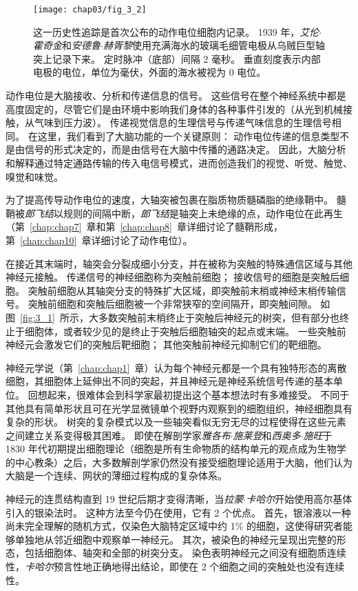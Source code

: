 \begin{figure}[htbp]
	\centering
	\texttt{[image: chap03/fig\_3\_2]}
	\caption{这一历史性追踪是首次公布的动作电位细胞内记录。 
		1939 年，\textit{艾伦$\cdot$霍奇金}和\textit{安德鲁$\cdot$赫胥黎}使用充满海水的玻璃毛细管电极从乌贼巨型轴突上记录下来。
		定时脉冲（底部）间隔 2 毫秒。 
		垂直刻度表示内部电极的电位，单位为毫伏，外面的海水被视为 0 电位\cite{hodgkin1939action}。}
	\label{fig:3_2}
\end{figure}


动作电位是大脑接收、分析和传递信息的信号。 
这些信号在整个神经系统中都是高度固定的，尽管它们是由环境中影响我们身体的各种事件引发的（从光到机械接触，从气味到压力波）。
传递视觉信息的生理信号与传递气味信息的生理信号相同。
在这里，我们看到了大脑功能的一个关键原则：
动作电位传递的信息类型不是由信号的形式决定的，而是由信号在大脑中传播的通路决定。
因此，大脑分析和解释通过特定通路传输的传入电信号模式，进而创造我们的视觉、听觉、触觉、嗅觉和味觉。


为了提高传导动作电位的速度，大轴突被包裹在脂质物质髓磷脂的绝缘鞘中。
髓鞘被\textit{郎飞结}以规则的间隔中断，\textit{郎飞结}是轴突上未绝缘的点，动作电位在此再生（第~\ref{chap:chap7}~章和第~\ref{chap:chap8}~章详细讨论了髓鞘形成，第~\ref{chap:chap10}~章详细讨论了动作电位）。


在接近其末端时，轴突会分裂成细小分支，并在被称为突触的特殊通信区域与其他神经元接触。
传递信号的神经细胞称为突触前细胞；
接收信号的细胞是突触后细胞。
突触前细胞从其轴突分支的特殊扩大区域，即突触前末梢或神经末梢传输信号。
突触前细胞和突触后细胞被一个非常狭窄的空间隔开，即突触间隙。
如图~\ref{fig:3_1}~所示，大多数突触前末梢终止于突触后神经元的树突，但有部分也终止于细胞体，或者较少见的是终止于突触后细胞轴突的起点或末端。
一些突触前神经元会激发它们的突触后靶细胞；
其他突触前神经元抑制它们的靶细胞。


神经元学说（第~\ref{chap:chap1}~章）认为每个神经元都是一个具有独特形态的离散细胞，其细胞体上延伸出不同的突起，并且神经元是神经系统信号传递的基本单位。
回想起来，很难体会到科学家最初提出这个基本想法时有多难接受。
不同于其他具有简单形状且可在光学显微镜单个视野内观察到的细胞组织，神经细胞具有复杂的形状。
树突的复杂模式以及一些轴突看似无穷无尽的过程使得在这些元素之间建立关系变得极其困难。
即使在解剖学家\textit{雅各布$\cdot$施莱登}和\textit{西奥多$\cdot$施旺}于 1830 年代初期提出细胞理论（细胞是所有生命物质的结构单元的观点成为生物学的中心教条）之后，大多数解剖学家仍然没有接受细胞理论适用于大脑，他们认为大脑是一个连续、网状的薄细过程构成的复杂体系。


神经元的连贯结构直到 19 世纪后期才变得清晰，当\textit{拉蒙$\cdot$卡哈尔}开始使用高尔基体引入的银染法时。
这种方法至今仍在使用，它有 2 个优点。
首先，银溶液以一种尚未完全理解的随机方式，仅染色大脑特定区域中约 1\% 的细胞，这使得研究者能够单独地从邻近细胞中观察单一神经元。
其次，被染色的神经元呈现出完整的形态，包括细胞体、轴突和全部的树突分支。
染色表明神经元之间没有细胞质连续性，\textit{卡哈尔}预言性地正确地得出结论，即使在 2 个细胞之间的突触处也没有连续性。


